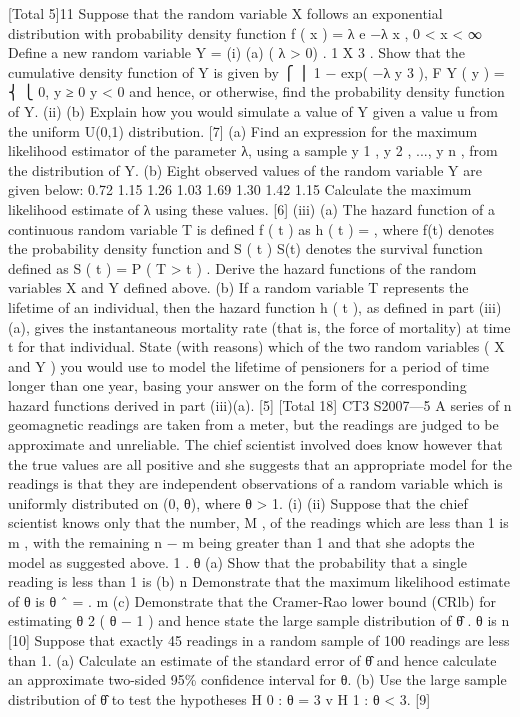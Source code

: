 \documentclass[a4paper,12pt]{article}
\begin{document}
\begin{enumerate}

[Total 5]11
Suppose that the random variable X follows an exponential distribution with
probability density function
f ( x ) = λ e −λ x , 0 < x < ∞
Define a new random variable Y =
(i)
(a)
( λ > 0) .
1
X 3 .
Show that the cumulative density function of Y is given by
⎧ ⎪ 1 − exp( −λ y 3 ),
F Y ( y ) = ⎨
⎩ 0,
y ≥ 0
y < 0
and hence, or otherwise, find the probability density function of Y.
(ii)
(b) Explain how you would simulate a value of Y given a value u from the
uniform U(0,1) distribution.
[7]
(a) Find an expression for the maximum likelihood estimator of the
parameter λ, using a sample y 1 , y 2 , ..., y n , from the distribution of Y.
(b) Eight observed values of the random variable Y are given below:
0.72 1.15 1.26 1.03 1.69 1.30 1.42 1.15
Calculate the maximum likelihood estimate of λ using these values. [6]
(iii)
(a)
The hazard function of a continuous random variable T is defined
f ( t )
as h ( t ) =
, where f(t) denotes the probability density function and
S ( t )
S(t) denotes the survival function defined as S ( t ) = P ( T > t ) .
Derive the hazard functions of the random variables X and Y defined
above.
(b)
If a random variable T represents the lifetime of an individual, then the
hazard function h ( t ), as defined in part (iii)(a), gives the instantaneous
mortality rate (that is, the force of mortality) at time t for that
individual.
State (with reasons) which of the two random variables ( X and Y ) you
would use to model the lifetime of pensioners for a period of time
longer than one year, basing your answer on the form of the
corresponding hazard functions derived in part (iii)(a).
[5]
[Total 18]
CT3 S2007—5
A series of n geomagnetic readings are taken from a meter, but the readings are
judged to be approximate and unreliable. The chief scientist involved does know
however that the true values are all positive and she suggests that an appropriate
model for the readings is that they are independent observations of a random variable
which is uniformly distributed on (0, θ), where θ > 1.
(i)
(ii)
Suppose that the chief scientist knows only that the number, M , of the readings
which are less than 1 is m , with the remaining n − m being greater than 1 and
that she adopts the model as suggested above.
1
.
θ
(a) Show that the probability that a single reading is less than 1 is
(b) n
Demonstrate that the maximum likelihood estimate of θ is θ ˆ = .
m
(c) Demonstrate that the Cramer-Rao lower bound (CRlb) for estimating
θ 2 ( θ − 1 )
and hence state the large sample distribution of θ̂ .
θ is
n
[10]
Suppose that exactly 45 readings in a random sample of 100 readings are less
than 1.
(a) Calculate an estimate of the standard error of θ̂ and hence calculate an
approximate two-sided 95\% confidence interval for θ.
(b) Use the large sample distribution of θ̂ to test the hypotheses
H 0 : θ = 3 v H 1 : θ < 3.
[9]


\end{enumerate}
\end{document}

